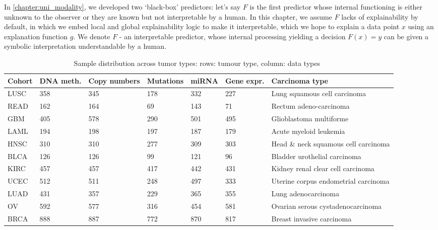 \hspace*{3.5mm} In \cref{chapter:uni_modality}, we developed two `black-box' predictors: let's say $F$ is the first predictor whose internal functioning is either unknown to the observer or they are known but not interpretable by a human. In this chapter, we assume $F$ lacks of explainability by default, in which we embed local and global explainability logic to make it interpretable, which we hope to explain a data point $x$ using an explanation function $g$. We denote ${F}$ - an interpretable predictor, whose internal processing yielding a decision ${F}(x)=y$ can be given a symbolic interpretation understandable by a human. 

\begin{table} [h]
\centering
    \scriptsize
    \caption{Sample distribution across tumor types: rows: tumour type, column: data types~\cite{weinstein2013cancer}}
    \label{table:alldatadetails2}
    \begin{tabular}{l|l|l|l|l|l|l}
        \hline
        \rowcolor{Gray}
         \textbf{Cohort} & \textbf{DNA meth.} & \textbf{Copy numbers} & \textbf{Mutations} & \textbf{miRNA} & \textbf{Gene expr.} & \textbf{Carcinoma type} \\\hline
            LUSC & 358 & 345 & 178 & 332 & 227 & Lung squamous cell carcinoma \\\hline
            READ & 162 & 164 & 69 & 143 & 71 & Rectum adeno-carcinoma \\%
            GBM  & 405 & 578 & 290 & 501 & 495 & Glioblastoma multiforme \\\hline
            LAML & 194 & 198 & 197 & 187 & 179 & Acute myeloid leukemia	\\%
            HNSC & 310 & 310 & 277 & 309 & 303 & Head \& neck squamous cell carcinoma \\\hline 
            BLCA & 126 & 126 & 99 & 121 & 96 & Bladder urothelial carcinoma \\\hline 
            KIRC & 457 & 457 & 417 & 442 & 431 & Kidney renal clear cell carcinoma  \\\hline
            UCEC & 512 & 511 & 248 & 497 & 333 & Uterine corpus endometrial carcinoma \\\hline
            LUAD & 431 & 357 & 229 & 365 & 355 & Lung adenocarcinoma \\\hline
            OV   & 592 & 577 & 316 & 454 & 581 & Ovarian serous cystadenocarcinoma \\\hline
            BRCA & 888 & 887 & 772 & 870 & 817 & Breast invasive carcinoma  \\\hline

\end{tabular}
\end{table}
